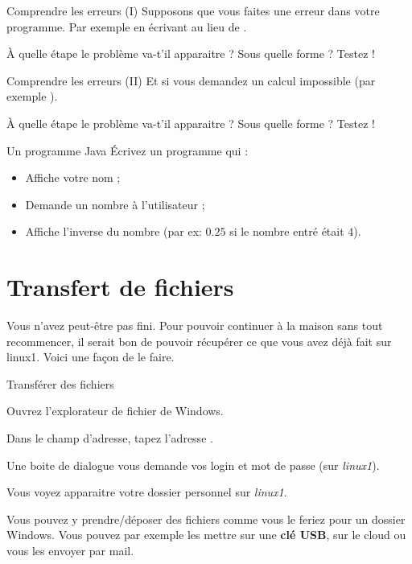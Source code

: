 \documentclass[a4paper,11pt]{style-esi/td}
\begin{document}
	\begin{Exercice}{Comprendre les erreurs (I)}
		Supposons que vous faites une erreur dans votre programme.
		Par exemple en écrivant  
		au lieu de .

		À quelle étape le problème va-t'il apparaitre ?
		Sous quelle forme ? Testez !
	\end{Exercice}

	\begin{Exercice}{Comprendre les erreurs (II)}
		Et si vous demandez un calcul impossible (par exemple ).

		À quelle étape le problème va-t'il apparaitre ?
		Sous quelle forme ? Testez !
	\end{Exercice}

	\begin{Exercice}{Un programme Java}
		Écrivez un programme qui :
		\begin{itemize}
		\item Affiche votre nom ;
		\item Demande un nombre à l'utilisateur ;
		\item Affiche l'inverse du nombre (par ex: $0.25$ si le nombre entré était $4$).
		\end{itemize}
	\end{Exercice}

\section{Transfert de fichiers}  

	Vous n'avez peut-être pas fini. Pour pouvoir continuer à la maison sans tout recommencer, 
    il serait bon de pouvoir récupérer ce que vous avez déjà fait sur linux1.
	Voici une façon de le faire.			
				
	\begin{Tutoriel}{Transférer des fichiers}
	\begin{steps}		
		\item 
			Ouvrez l'explorateur de fichier de Windows.
		\item 
			Dans le champ d'adresse, tapez l'adresse .
		\item 
			Une boite de dialogue vous demande vos login et mot de passe (sur \textit{linux1}).
		\item 
			Vous voyez apparaitre votre dossier personnel sur \textit{linux1}. 
		\item 
			Vous pouvez y prendre/déposer des fichiers comme vous le feriez pour un dossier Windows. 
			Vous pouvez par exemple les mettre sur une \textbf{clé USB},
			sur le cloud ou vous les envoyer par mail.
	\end{steps}
	\end{Tutoriel}			
\end{document}
